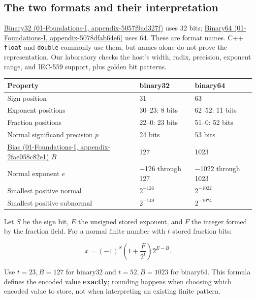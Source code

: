 \subsection{The two formats and their interpretation}\label{05-engine-i-ch001-the-two-formats-and-their-interpretation}

\href{../01-Foundations-I/main.pdf\#nameddest=appendix-5057f9ad327f}{Binary32 (01-Foundations-I, appendix-5057f9ad327f)} uses 32 bits; \href{../01-Foundations-I/main.pdf\#nameddest=appendix-5078dfab64e6}{Binary64 (01-Foundations-I, appendix-5078dfab64e6)} uses 64. These are format names. C++ \texttt{float} and \texttt{double} commonly use them, but names alone do not prove the representation. Our laboratory checks the host's width, radix, precision, exponent range, and IEC-559 support, plus golden bit patterns.

{\def\LTcaptype{none} %
\begin{longtable}[]{@{}lll@{}}
\toprule\noalign{}
Property & binary32 & binary64 \\
\midrule\noalign{}
\endhead
\bottomrule\noalign{}
\endlastfoot
Sign position & 31 & 63 \\
Exponent positions & 30--23: 8 bits & 62--52: 11 bits \\
Fraction positions & 22--0: 23 bits & 51--0: 52 bits \\
Normal significand precision \(p\) & 24 bits & 53 bits \\
\href{../01-Foundations-I/main.pdf\#nameddest=appendix-2fae058c82e1}{Bias (01-Foundations-I, appendix-2fae058c82e1)} \(B\) & 127 & 1023 \\
Normal exponent \(e\) & −126 through 127 & −1022 through 1023 \\
Smallest positive normal & \(2^{-126}\) & \(2^{-1022}\) \\
Smallest positive subnormal & \(2^{-149}\) & \(2^{-1074}\) \\
\end{longtable}
}

Let \(S\) be the sign bit, \(E\) the unsigned stored exponent, and \(F\) the integer formed by the fraction field. For a normal finite number with \(t\) stored fraction bits:

\[
x=(-1)^S\left(1+\frac{F}{2^t}\right)2^{E-B}.
\]

Use \(t=23,B=127\) for binary32 and \(t=52,B=1023\) for binary64. This formula defines the encoded value \textbf{exactly}; rounding happens when choosing which encoded value to store, not when interpreting an existing finite pattern.

